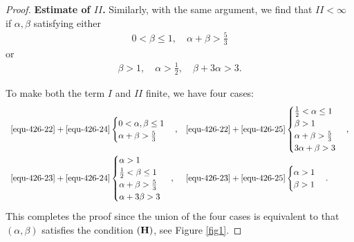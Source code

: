 \documentclass[12pt]{amsart}
\theoremstyle{definition}
\numberwithin{equation}{section}
\begin{document}
\begin{proof}



{\bf Estimate of $II$.} Similarly, with the same argument, we find that $II<\infty$ if $\alpha,\beta$ satisfying either
\begin{align} \label{equ-426-24}
0<\beta\leq 1, \quad \alpha+\beta>\frac{5}{3}
\end{align}
or
\begin{align} \label{equ-426-25}
\beta>1, \quad \alpha>\frac{1}{2}, \quad \beta+3\alpha>3.
\end{align}



 To make  both the term $I$ and $II$ finite, we have four cases:
 \begin{equation*}
 \begin{array}{ll}
\eqref{equ-426-22}+\eqref{equ-426-24}
 \begin{cases}
  0< \alpha,\beta\le 1  \\
  \alpha+\beta>\frac{5}{3}
 \end{cases},
 &
 \eqref{equ-426-22}+\eqref{equ-426-25}
 \begin{cases}
  \frac{1}{2}<\alpha\leq 1\\
  \beta>1 \\
  \alpha+\beta>\frac{5}{3}\\
  3\alpha+\beta>3
  \end{cases},\\
%
 \eqref{equ-426-23}+\eqref{equ-426-24}
 \begin{cases}
  \alpha>1\\
  \frac{1}{2}<\beta\leq 1 \\
  \alpha+\beta>\frac{5}{3}\\
  \alpha+3\beta>3
 \end{cases},
 &
 \eqref{equ-426-23}+\eqref{equ-426-25}
 \begin{cases}
  \alpha>1 \\
  \beta>1
 \end{cases}.
 \end{array}
\end{equation*}
This completes the proof since the union of the four cases is equivalent to that $(\alpha,\beta)$ satisfies the condition $({\bf H})$, see Figure \ref{fig1}.


\end{proof}
\end{document}
